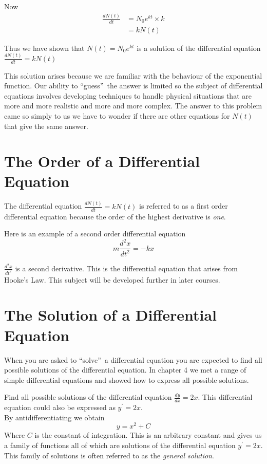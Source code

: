 Now
\begin{align*}\frac{d N (t)}{d t} &    = N_{0} e^{k t} \times k \\
 &    = k N (t)\end{align*}

Thus we have shown that $N (t) =N_{0} e^{k t}$ is a solution of the differential equation $\frac{d N (t)}{d t} =k N (t)$ 

This solution arises because we are familiar with the behaviour of the exponential function.  Our ability to ``guess''\ the answer is limited so the subject of differential equations involves developing techniques to handle physical situations that are more and more realistic and more and more complex.  The answer to this problem came so simply to us we have to wonder if there are other equations for $N (t)$ that give the same answer. 

\section*{The Order of a Differential Equation}
The differential equation $\frac{d N (t)}{d t} =k N (t)$ is referred to as a first order differential equation because the order of the highest derivative is \emph{one}.

Here is an example of a second order differential equation
\begin{equation*}m \frac{d^{2} x}{d t^{2}} = -k x
\end{equation*}

$\frac{d^{2} x}{d t^{2}}$ is a second derivative.  This is the differential equation that arises from Hooke's Law. This subject will be developed further in later courses. 

\section*{The Solution of a Differential Equation}
When you are asked to ``solve''\ a differential equation you are expected to find all possible solutions of the differential equation.  In chapter 4 we met a range of simple differential equations and showed how to express all possible solutions. 

\example Find all possible solutions of the differential equation $\frac{d y}{d x} =2 x\text{.}$  This differential equation could also be expressed as $y^{ \prime } =2 x\text{.}$\medskip\\
\solution By antidifferentiating we obtain
\begin{equation*}y =x^{2} +C
\end{equation*}
Where $C$ is the constant of integration.  This is an arbitrary constant and gives us a family of functions all of which are solutions of the differential equation $y^{ \prime } =2 x$.  This family of solutions is often referred to as the \emph{general solution}.

